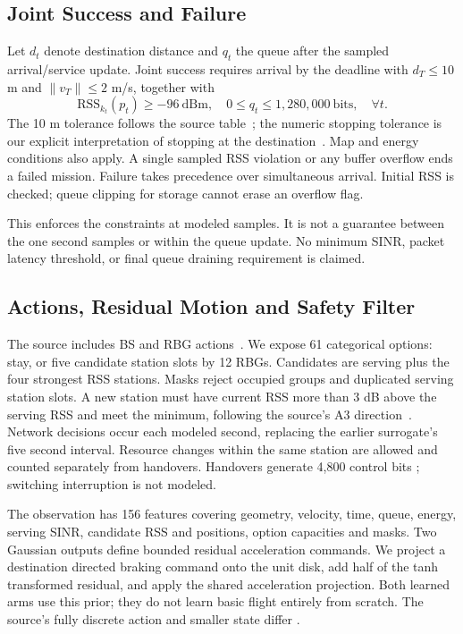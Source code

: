 \documentclass[conference]{IEEEtran}
\begin{document}
\subsection{Joint Success and Failure}
Let $d_t$ denote destination distance and $q_t$ the queue after the sampled
arrival/service update. Joint success requires arrival by the deadline with
$d_T\leq10$ m and $\|v_T\|\leq2$ m/s, together with
\begin{equation}
\mathrm{RSS}_{k_t}(p_t)\geq-96\ \mathrm{dBm},\quad
0\leq q_t\leq1{,}280{,}000\ \mathrm{bits},\quad\forall t.
\end{equation}
The 10 m tolerance follows the source table~\cite[p.~15, Table~3]{thesis}; the
numeric stopping tolerance is our explicit interpretation of stopping at the
destination~\cite[p.~9, Sec.~3.2]{thesis}. Map and energy conditions also apply.
A single sampled RSS violation or any buffer overflow ends a failed mission.
Failure takes precedence over simultaneous arrival. Initial RSS is checked;
queue clipping for storage cannot erase an overflow flag.

This enforces the constraints at modeled samples. It is not a guarantee
between the one second samples or within the queue update. No minimum SINR,
packet latency threshold, or final queue draining requirement is claimed.

\subsection{Actions, Residual Motion and Safety Filter}
The source includes BS and RBG actions~\cite[p.~12, Sec.~5.2]{thesis}. We expose
61 categorical options: stay, or five candidate station slots by 12 RBGs.
Candidates are serving plus the four strongest RSS stations. Masks reject
occupied groups and duplicated serving station slots. A new station must have
current RSS more than 3 dB above the serving RSS and meet the minimum, following
the source's A3 direction~\cite[p.~9, Eq.~(3); p.~15, Table~3]{thesis}.
Network decisions occur each modeled second, replacing the earlier surrogate's
five second interval. Resource changes within the same station are allowed and
counted separately from handovers. Handovers generate 4,800 control bits
\cite[p.~15, Table~3]{thesis}; switching interruption is not modeled.

The observation has 156 features covering geometry, velocity, time, queue,
energy, serving SINR, candidate RSS and positions, option capacities and masks.
Two Gaussian outputs define bounded residual acceleration commands. We project
a destination directed braking command onto the unit disk, add half of the
tanh transformed residual, and apply the shared acceleration projection. Both
learned arms use this prior; they do not learn basic flight entirely from
scratch. The source's fully discrete action and smaller state differ
\cite[p.~12, Sec.~5.2]{thesis}.
\end{document}
